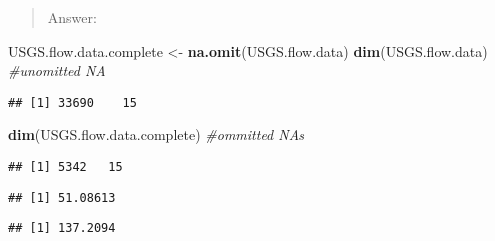 \documentclass[]{article}
\newenvironment{Shaded}{\begin{snugshade}}{\end{snugshade}}
\newcommand{\CommentTok}[1]{\textcolor[rgb]{0.56,0.35,0.01}{\textit{#1}}}
\newcommand{\KeywordTok}[1]{\textcolor[rgb]{0.13,0.29,0.53}{\textbf{#1}}}
\newcommand{\NormalTok}[1]{#1}
\newcommand{\OperatorTok}[1]{\textcolor[rgb]{0.81,0.36,0.00}{\textbf{#1}}}
\newcommand{\StringTok}[1]{\textcolor[rgb]{0.31,0.60,0.02}{#1}}
\begin{document}
\begin{quote}
Answer:
\end{quote}

\begin{Shaded}
\begin{Highlighting}[]
\NormalTok{USGS.flow.data.complete <-}\StringTok{ }\KeywordTok{na.omit}\NormalTok{(USGS.flow.data)}
\KeywordTok{dim}\NormalTok{(USGS.flow.data) }\CommentTok{#unomitted NA}
\end{Highlighting}
\end{Shaded}

\begin{verbatim}
## [1] 33690    15
\end{verbatim}

\begin{Shaded}
\begin{Highlighting}[]
\KeywordTok{dim}\NormalTok{(USGS.flow.data.complete) }\CommentTok{#ommitted NAs}
\end{Highlighting}
\end{Shaded}

\begin{verbatim}
## [1] 5342   15
\end{verbatim}

\begin{Shaded}
\end{Shaded}

\begin{verbatim}
## [1] 51.08613
\end{verbatim}

\begin{Shaded}
\end{Shaded}

\begin{verbatim}
## [1] 137.2094
\end{verbatim}

\begin{Shaded}
\end{Shaded}
\end{document}
